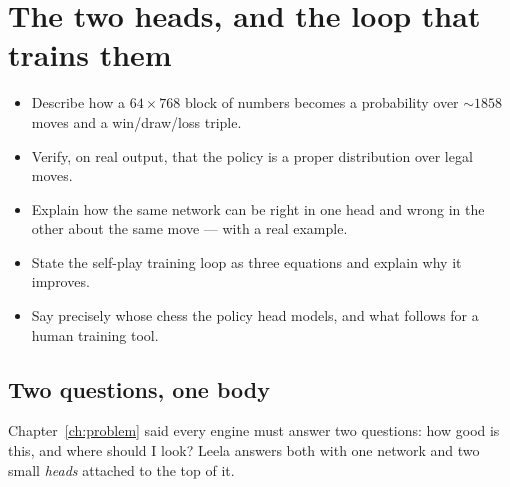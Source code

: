 \chapter{The two heads, and the loop that trains them}
\label{ch:heads}

\begin{objectives}
\begin{itemize}
\item Describe how a $64\times768$ block of numbers becomes a probability over $\sim\!1858$
  moves and a win/draw/loss triple.
\item Verify, on real output, that the policy is a proper distribution over legal moves.
\item Explain how the same network can be right in one head and wrong in the other about the
  same move --- with a real example.
\item State the self-play training loop as three equations and explain why it improves.
\item Say precisely whose chess the policy head models, and what follows for a human training
  tool.
\end{itemize}
\end{objectives}

\section{Two questions, one body}

Chapter~\ref{ch:problem} said every engine must answer two questions: how good is this, and
where should I look? Leela answers both with one network and two small \emph{heads} attached
to the top of it.

\begin{center}
\end{center}

